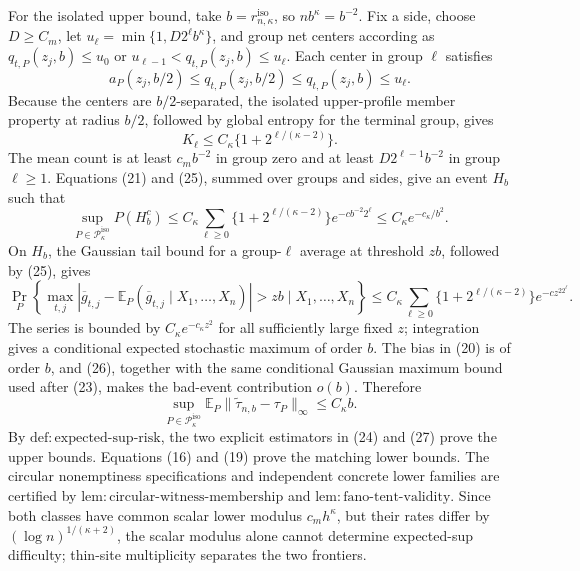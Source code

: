 For the isolated upper bound, take \(b=r_{n,\kappa}^{\mathrm{iso}}\), so \(nb^\kappa=b^{-2}\). Fix a side, choose \(D\ge C_m\), let \(u_\ell=\min\{1,D2^\ell b^\kappa\}\), and group net centers according as \(q_{t,P}(z_j,b)\le u_0\) or \(u_{\ell-1}<q_{t,P}(z_j,b)\le u_\ell\). Each center in group \(\ell\) satisfies
\[
 a_P(z_j,b/2)\le q_{t,P}(z_j,b/2)\le q_{t,P}(z_j,b)\le u_\ell.
\]
Because the centers are \(b/2\)-separated, the isolated upper-profile member property at radius \(b/2\), followed by global entropy for the terminal group, gives
\[
 K_\ell\le C_\kappa\{1+2^{\ell/(\kappa-2)}\}. \tag{25}
\]
The mean count is at least \(c_mb^{-2}\) in group zero and at least \(D2^{\ell-1}b^{-2}\) in group \(\ell\ge1\). Equations (21) and (25), summed over groups and sides, give an event \(H_b\) such that
\[
 \sup_{P\in\mathcal P_\kappa^{\mathrm{iso}}}P(H_b^c)
 \le C_\kappa\sum_{\ell\ge0}\{1+2^{\ell/(\kappa-2)}\}e^{-cb^{-2}2^\ell}
 \le C_\kappa e^{-c_\kappa/b^2}. \tag{26}
\]
On \(H_b\), the Gaussian tail bound for a group-\(\ell\) average at threshold \(zb\), followed by (25), gives
\[
 \Pr_P\!\left\{
 \max_{t,j}|\overline g_{t,j}-\mathbb E_P(\overline g_{t,j}\mid X_1,\ldots,X_n)|>zb
 \mid X_1,\ldots,X_n\right\}
 \le C_\kappa\sum_{\ell\ge0}\{1+2^{\ell/(\kappa-2)}\}e^{-cz^22^\ell}.
\]
The series is bounded by \(C_\kappa e^{-c_\kappa z^2}\) for all sufficiently large fixed \(z\); integration gives a conditional expected stochastic maximum of order \(b\). The bias in (20) is of order \(b\), and (26), together with the same conditional Gaussian maximum bound used after (23), makes the bad-event contribution \(o(b)\). Therefore
\[
 \sup_{P\in\mathcal P_\kappa^{\mathrm{iso}}}
 \mathbb E_P\|\widetilde\tau_{n,b}-\tau_P\|_\infty
 \le C_\kappa b. \tag{27}
\]
By \(\mathrm{def:expected\text{-}sup\text{-}risk}\), the two explicit estimators in (24) and (27) prove the upper bounds. Equations (16) and (19) prove the matching lower bounds. The circular nonemptiness specifications and independent concrete lower families are certified by \(\mathrm{lem:circular\text{-}witness\text{-}membership}\) and \(\mathrm{lem:fano\text{-}tent\text{-}validity}\). Since both classes have common scalar lower modulus \(c_mh^\kappa\), but their rates differ by \((\log n)^{1/(\kappa+2)}\), the scalar modulus alone cannot determine expected-sup difficulty; thin-site multiplicity separates the two frontiers.